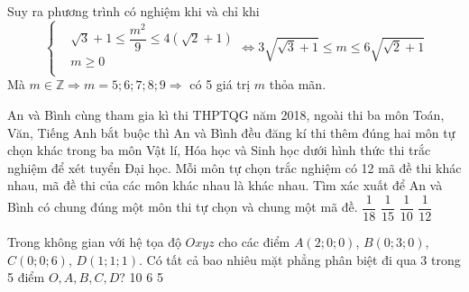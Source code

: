 \begin{ex}
{\begin{center}
\end{center}
Suy ra phương trình có nghiệm khi và chỉ khi
$$\left\{{\begin{aligned}&{\sqrt{3}+1\leqslant \dfrac{m^2}{9}\leqslant 4\left({\sqrt{2}+1}\right)} \\ &{m\geqslant 0} \\ \end{aligned}}\right.
	\Leftrightarrow 3\sqrt{{\sqrt{3}+1}}\leqslant m\leqslant 6\sqrt{{\sqrt{2}+1}}$$
	Mà $m\in \mathbb{Z} \Rightarrow m=5; 6; 7; 8; 9 \Rightarrow $ có 5 giá trị $m$ thỏa mãn.
}
\end{ex}
\begin{ex}%
	An và Bình cùng tham gia kì thi THPTQG năm 2018, ngoài thi ba môn Toán, Văn, Tiếng Anh bắt buộc thì An và Bình đều đăng kí thi thêm đúng hai môn tự chọn khác trong ba môn Vật lí, Hóa học và Sinh học dưới hình thức thi trắc nghiệm để xét tuyển Đại học. Mỗi môn tự chọn trắc nghiệm có 12 mã đề thi khác nhau, mã đề thi của các môn khác nhau là khác nhau. Tìm xác xuất để An và Bình có chung đúng một môn thi tự chọn và chung một mã đề.
	\choice
	{\True $\dfrac{1}{18}$}
	{$\dfrac{1}{15}$}
	{$\dfrac{1}{10}$}
	{$\dfrac{1}{12}$}
\end{ex}
\begin{ex}%
	Trong không gian với hệ tọa độ $Oxyz$ cho các điểm $A(2;0;0)$, $B(0;3;0)$, $C(0;0;6)$, $D\left({1;1;1}\right)$. Có tất cả bao nhiêu mặt phẳng phân biệt đi qua 3 trong 5 điểm $O,A,B,C,D$?
	\choice
	{10}
	{6}
	{}
	{5}
\end{ex}
